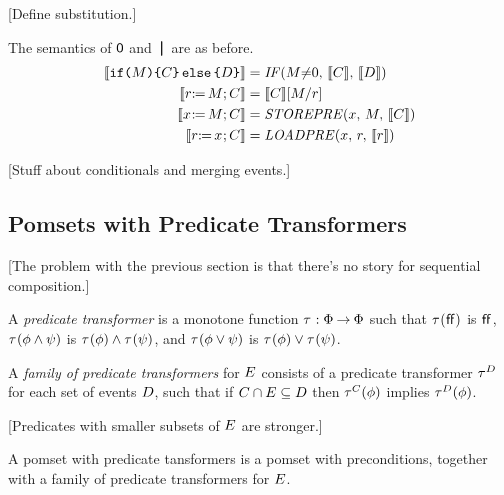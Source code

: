 [Define substitution.]

The semantics of $\NIL$ and $\PAR$ are as before.
\begin{align*}
  \sem{\IF{\aExp}\THEN\aCmd\ELSE\bCmd\FI} &= \sIF{\aExp{\neq}0}\sTHEN\sem{\aCmd}\sELSE\sem{\bCmd}\sFI
  \\
  \sem{\LET{\aReg}{\aExp}\SEMI \aCmd} &= \sem{\aCmd}[\aExp/\aReg]
  \\
  \sem{\PW{\aLoc}{\aExp}\SEMI \aCmd} &= \sSTOREPRE{\aLoc}{\aExp}{\sem{\aCmd}}
  \\
  \sem{\PR{\aLoc}{\aReg}\SEMI \aCmd} &= \sLOADPRE{\aLoc}{\aReg}{\sem{\aReg}}
\end{align*}

[Stuff about conditionals and merging events.]


\subsection{Pomsets with Predicate Transformers}

[The problem with the previous section is that there's no story for
sequential composition.]

\begin{definition}
  A \emph{predicate transformer} is a monotone function
  $\aTr:\Formulae\fun\Formulae$ such that
  $\aTr(\FALSE)$ is $\FALSE$,
  $\aTr(\aForm\land\bForm)$ is $\aTr(\aForm)\land\aTr(\bForm)$, and
  $\aTr(\aForm\lor\bForm)$ is $\aTr(\aForm)\lor\aTr(\bForm)$.
\end{definition}

\begin{definition}
  A \emph{family of predicate transformers}
  for $\aEvs$
  consists of a predicate transformer
  $\aTr[\bEvs]$ for each set of events $\bEvs$,
  such that if $\cEvs \cap \aEvs \subseteq \bEvs$
  then $\aTr[\cEvs](\aForm)$ implies $\aTr[\bEvs](\aForm)$.
\end{definition}

[Predicates with smaller subsets of $\aEvs$ are stronger.]

\begin{definition}
  A pomset with predicate tansformers is a pomset with preconditions,
  together with a family of predicate transformers for $\aEvs$.
\end{definition}


